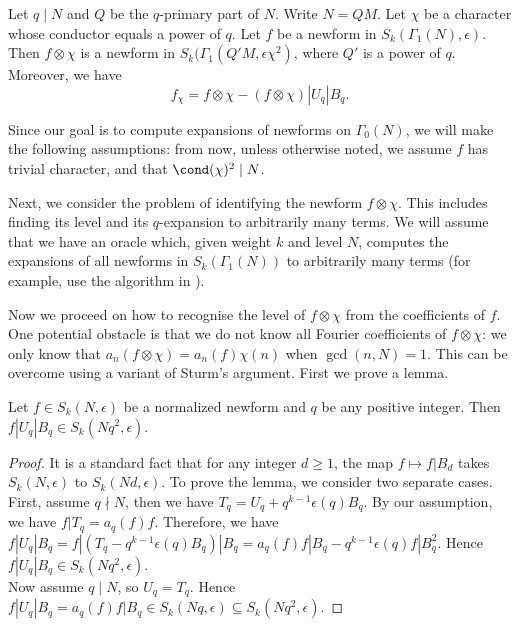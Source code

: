 \documentclass [11pt, proquest] {uwthesis}[2015/03/03]
\begin{document}
\begin{Lemma}\cite[Theorem 3.2]{atkin1978twists} \label{lemma: fchi}
Let $q \mid N$ and $Q$ be the $q$-primary part of $N$. Write $N = QM$. Let $\chi$ be a character whose conductor equals a power of $q$.  Let $f$ be a newform in $S_k(\Gamma_1(N), \epsilon)$. Then $f \otimes \chi$  is a newform in $S_k(\Gamma_1(Q'M,\epsilon \chi^2)$, where $Q'$ is a power of $q$. Moreover, we have $$f_\chi  = f \otimes \chi - (f \otimes \chi) |U_q |B_q.$$
\end{Lemma}

Since our goal is to compute expansions of newforms on $\Gamma_0(N)$, we will make the following assumptions: 
from now, unless otherwise noted, we assume $f$ has trivial character, and that $\cond(\chi)^2 \mid N$.


Next, we consider the problem of identifying the newform $f \otimes \chi$. This includes finding its level and its $q$-expansion to arbitrarily many terms. We will assume that we have an oracle which, given weight $k$ and level $N$, computes the expansions of all newforms in $S_k(\Gamma_1(N))$ to arbitrarily many terms (for example, use the algorithm in \cite{stein2007modular}).

Now we proceed on how to recognise the level of $f \otimes \chi$ from the coefficients of $f$. One potential obstacle is that we do not know all Fourier coefficients of $f \otimes \chi$: we only know that $a_n(f \otimes \chi)  = a_n(f)\chi(n)$   when $\gcd(n, N) = 1$. This can be overcome using a variant of Sturm's argument. First we prove a lemma.
\begin{Lemma}
Let $f \in S_k(N, \epsilon)$ be a normalized newform and $q$ be any positive integer. Then $f|U_q|B_q \in S_k(Nq^2, \epsilon)$.
\end{Lemma}

\begin{proof}
It is a standard fact that for any integer $d \geq 1$, the map $f \mapsto f|B_d$ takes $S_k(N, \epsilon)$ to 
$S_k(Nd, \epsilon)$. To prove the lemma, we consider two separate cases. First, assume $q \nmid N$, then we have 
$T_q = U_q + q^{k-1} \epsilon(q) B_q$. By our assumption, we have $f|T_q = a_q(f) f$. Therefore, we have 
$f|U_q|B_q = f|(T_q - q^{k-1} \epsilon(q) B_q)|B_q = a_q(f)f|B_q - q^{k-1} \epsilon(q) f|B_q^2$. Hence $f|U_q|B_q \in S_k(Nq^2, \epsilon)$. \\
Now assume $q \mid N$, so $U_q = T_q$. Hence $f|U_q|B_q = a_q(f) f|B_q \in S_k(Nq, \epsilon) \subseteq  S_k(Nq^2, \epsilon)$. 
\end{proof}
\end{document}
